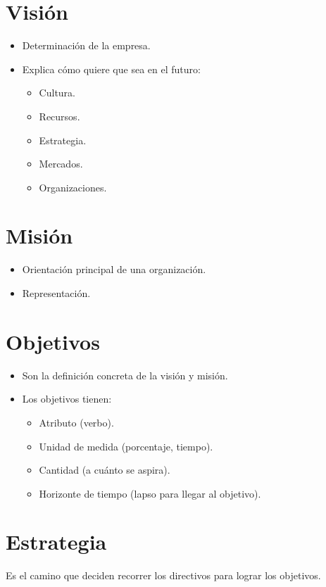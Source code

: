 \documentclass[12pt, spanish, a5paper]{article}
\begin{document}
\section{Visión}
	\begin{itemize}
		\item Determinación de la empresa.
		\item Explica cómo quiere que sea en el futuro:
		\begin{itemize}
			\item Cultura.
			\item Recursos.
			\item Estrategia.
			\item Mercados.
			\item Organizaciones.
		\end{itemize}
	\end{itemize}

\section{Misión}
\begin{itemize}
	\item Orientación principal de una organización.
	\item Representación.
\end{itemize}

\section{Objetivos}
\begin{itemize}
	\item Son la definición concreta de la visión y misión.
	\item Los objetivos tienen:
	\begin{itemize}
		\item Atributo (verbo).
		\item Unidad de medida (porcentaje, tiempo).
		\item Cantidad (a cuánto se aspira).
		\item Horizonte de tiempo (lapso para llegar al objetivo).
	\end{itemize}
\end{itemize}

\section{Estrategia}

Es el camino que deciden recorrer los directivos para lograr los objetivos.
\end{document}
